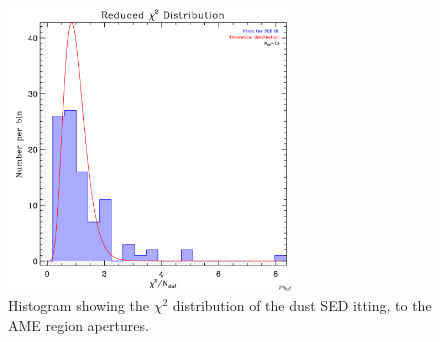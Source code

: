 \documentclass[preprint2,longabstract]{aastex}
\begin{document}

\begin{figure}
  \label{fig:AME_regs_chi2}
  \includegraphics[width=75mm]{../Plots/histo_chi2red.pdf}
  \centering
  \caption{Histogram showing the $\chi^{2}$ distribution of the dust SED itting, to the AME region apertures. }
\end{figure}
\end{document}
